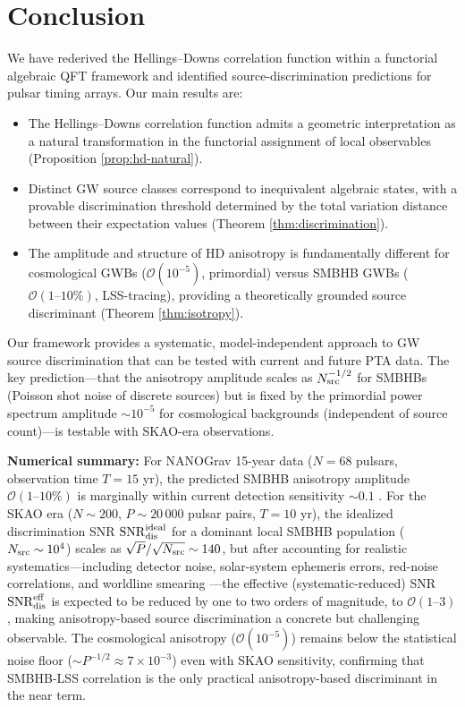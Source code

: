 \documentclass[11pt,a4paper]{article}
\begin{document}
\section{Conclusion}\label{sec:conclusion}

We have rederived the Hellings--Downs correlation function within a functorial algebraic QFT framework and identified source-discrimination predictions for pulsar timing arrays. Our main results are:

\begin{itemize}
\item The Hellings--Downs correlation function admits a geometric interpretation as a natural transformation in the functorial assignment of local observables (Proposition \ref{prop:hd-natural}).
\item Distinct GW source classes correspond to inequivalent algebraic states, with a provable discrimination threshold determined by the total variation distance between their expectation values (Theorem \ref{thm:discrimination}).
\item The amplitude and structure of HD anisotropy is fundamentally different for cosmological GWBs ($\mathcal{O}(10^{-5})$, primordial) versus SMBHB GWBs ($\mathcal{O}(1\text{--}10\%)$, LSS-tracing), providing a theoretically grounded source discriminant (Theorem \ref{thm:isotropy}).
\end{itemize}

Our framework provides a systematic, model-independent approach to GW source discrimination that can be tested with current and future PTA data. The key prediction---that the anisotropy amplitude scales as $N_{\rm src}^{-1/2}$ for SMBHBs (Poisson shot noise of discrete sources) but is fixed by the primordial power spectrum amplitude $\sim 10^{-5}$ for cosmological backgrounds (independent of source count)---is testable with SKAO-era observations.

\textbf{Numerical summary:} For NANOGrav 15-year data ($N = 68$ pulsars, observation time $T = 15$ yr), the predicted SMBHB anisotropy amplitude $\mathcal{O}(1\text{--}10\%)$ is marginally within current detection sensitivity $\sim 0.1$ \cite{Lemke:2024}. For the SKAO era ($N \sim 200$, $P \sim 20\,000$ pulsar pairs, $T = 10$ yr), the idealized discrimination SNR $\mathrm{SNR}_{\rm dis}^{\rm ideal}$ for a dominant local SMBHB population ($N_{\rm src} \sim 10^4$) scales as $\sqrt{P}/\sqrt{N_{\rm src}} \sim 140$, but after accounting for realistic systematics---including detector noise, solar-system ephemeris errors, red-noise correlations, and worldline smearing \cite{Allen:2023}---the effective (systematic-reduced) SNR $\mathrm{SNR}_{\rm dis}^{\rm eff}$ is expected to be reduced by one to two orders of magnitude, to $\mathcal{O}(1\text{--}3)$, making anisotropy-based source discrimination a concrete but challenging observable. The cosmological anisotropy ($\mathcal{O}(10^{-5})$) remains below the statistical noise floor ($\sim P^{-1/2} \approx 7 \times 10^{-3}$) even with SKAO sensitivity, confirming that SMBHB-LSS correlation is the only practical anisotropy-based discriminant in the near term.
\end{document}
